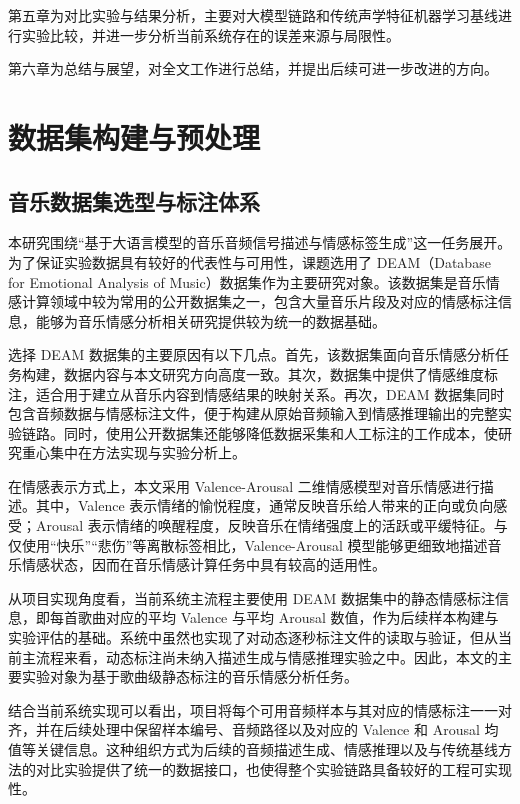 第五章为对比实验与结果分析，主要对大模型链路和传统声学特征机器学习基线进行实验比较，并进一步分析当前系统存在的误差来源与局限性。

第六章为总结与展望，对全文工作进行总结，并提出后续可进一步改进的方向。

\newpage

\section{数据集构建与预处理}

\subsection{音乐数据集选型与标注体系}
本研究围绕“基于大语言模型的音乐音频信号描述与情感标签生成”这一任务展开。为了保证实验数据具有较好的代表性与可用性，课题选用了 DEAM（Database for Emotional Analysis of Music）数据集作为主要研究对象\cite{aljanaki2017deam}。该数据集是音乐情感计算领域中较为常用的公开数据集之一，包含大量音乐片段及对应的情感标注信息，能够为音乐情感分析相关研究提供较为统一的数据基础。

选择 DEAM 数据集的主要原因有以下几点。首先，该数据集面向音乐情感分析任务构建，数据内容与本文研究方向高度一致。其次，数据集中提供了情感维度标注，适合用于建立从音乐内容到情感结果的映射关系。再次，DEAM 数据集同时包含音频数据与情感标注文件，便于构建从原始音频输入到情感推理输出的完整实验链路。同时，使用公开数据集还能够降低数据采集和人工标注的工作成本，使研究重心集中在方法实现与实验分析上。

在情感表示方式上，本文采用 Valence-Arousal 二维情感模型对音乐情感进行描述\cite{russell1980circumplex,yang2011musicemotion}。其中，Valence 表示情绪的愉悦程度，通常反映音乐给人带来的正向或负向感受；Arousal 表示情绪的唤醒程度，反映音乐在情绪强度上的活跃或平缓特征。与仅使用“快乐”“悲伤”等离散标签相比，Valence-Arousal 模型能够更细致地描述音乐情感状态，因而在音乐情感计算任务中具有较高的适用性。

从项目实现角度看，当前系统主流程主要使用 DEAM 数据集中的静态情感标注信息，即每首歌曲对应的平均 Valence 与平均 Arousal 数值，作为后续样本构建与实验评估的基础。系统中虽然也实现了对动态逐秒标注文件的读取与验证，但从当前主流程来看，动态标注尚未纳入描述生成与情感推理实验之中。因此，本文的主要实验对象为基于歌曲级静态标注的音乐情感分析任务。

结合当前系统实现可以看出，项目将每个可用音频样本与其对应的情感标注一一对齐，并在后续处理中保留样本编号、音频路径以及对应的 Valence 和 Arousal 均值等关键信息。这种组织方式为后续的音频描述生成、情感推理以及与传统基线方法的对比实验提供了统一的数据接口，也使得整个实验链路具备较好的工程可实现性。

